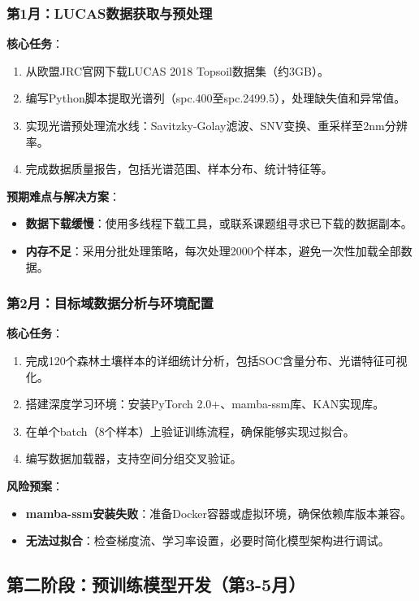 \documentclass[12pt, a4paper]{article}
\begin{document}
\subsubsection{第1月：LUCAS数据获取与预处理}
\textbf{核心任务}：
\begin{enumerate}
    \item 从欧盟JRC官网下载LUCAS 2018 Topsoil数据集（约3GB）。
    \item 编写Python脚本提取光谱列（spc.400至spc.2499.5），处理缺失值和异常值。
    \item 实现光谱预处理流水线：Savitzky-Golay滤波、SNV变换、重采样至2nm分辨率。
    \item 完成数据质量报告，包括光谱范围、样本分布、统计特征等。
\end{enumerate}

\textbf{预期难点与解决方案}：
\begin{itemize}
    \item \textbf{数据下载缓慢}：使用多线程下载工具，或联系课题组寻求已下载的数据副本。
    \item \textbf{内存不足}：采用分批处理策略，每次处理2000个样本，避免一次性加载全部数据。
\end{itemize}

\subsubsection{第2月：目标域数据分析与环境配置}
\textbf{核心任务}：
\begin{enumerate}
    \item 完成120个森林土壤样本的详细统计分析，包括SOC含量分布、光谱特征可视化。
    \item 搭建深度学习环境：安装PyTorch 2.0+、mamba-ssm库、KAN实现库。
    \item 在单个batch（8个样本）上验证训练流程，确保能够实现过拟合。
    \item 编写数据加载器，支持空间分组交叉验证。
\end{enumerate}

\textbf{风险预案}：
\begin{itemize}
    \item \textbf{mamba-ssm安装失败}：准备Docker容器或虚拟环境，确保依赖库版本兼容。
    \item \textbf{无法过拟合}：检查梯度流、学习率设置，必要时简化模型架构进行调试。
\end{itemize}

\subsection{第二阶段：预训练模型开发（第3-5月）}
\end{document}

